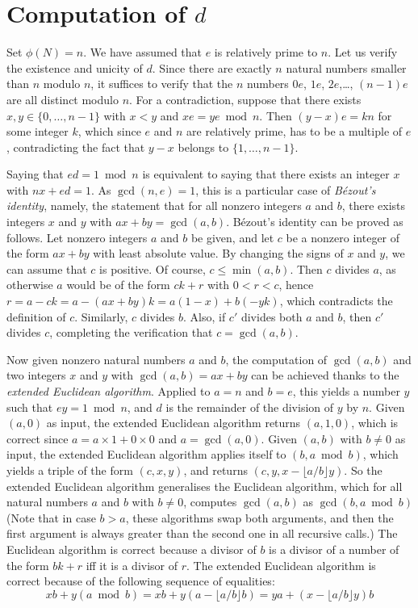 \documentclass{amsart}
\begin{document}
\section{Computation of $d$}

Set $\phi(N)=n$. We have assumed that $e$ is relatively prime to $n$. Let us verify the existence and unicity of $d$. Since there are exactly $n$ natural numbers smaller than $n$ modulo $n$, it suffices to verify that the $n$ numbers $0e$, $1e$, $2e$,\dots, $(n-1)e$ are all distinct modulo $n$. For a contradiction, suppose that there exists $x,y\in\{0,\dots,n-1\}$ with $x<y$ and $xe=ye\bmod n$. Then $(y-x)e=kn$ for some integer $k$, which since $e$ and $n$ are relatively prime, has to be a multiple of $e$, contradicting the fact that $y-x$ belongs to $\{1,\dots,n-1\}$.

Saying that $ed=1\bmod n$ is equivalent to saying that there exists an integer $x$ with $nx+ed=1$. As $\gcd(n,e)=1$, this is a particular case of \emph{B\'ezout's identity}, namely, the statement that for all nonzero integers $a$ and $b$, there exists integers $x$ and $y$ with $ax+by=\gcd(a,b)$. B\'ezout's identity can be proved as follows. Let nonzero integers $a$ and $b$ be given, and let $c$ be a nonzero integer of the form $ax+by$ with least absolute value. By changing the signs of $x$ and $y$, we can assume that $c$ is positive. Of course, $c\leq\min(a,b)$. Then $c$ divides $a$, as otherwise $a$ would be of the form $ck+r$ with $0<r<c$, hence $r=a-ck=a-(ax+by)k=a(1-x)+b(-yk)$, which contradicts the definition of $c$. Similarly, $c$ divides $b$. Also, if $c'$ divides both $a$ and $b$, then $c'$ divides $c$, completing the verification that $c=\gcd(a,b)$.

Now given nonzero natural numbers $a$ and $b$, the computation of $\gcd(a,b)$ and two integers $x$ and $y$ with $\gcd(a,b)=ax+by$ can be achieved thanks to the \emph{extended Euclidean algorithm}. Applied to $a=n$ and $b=e$, this yields a number $y$ such that $ey=1\bmod n$, and $d$ is the remainder of the division of $y$ by $n$. Given $(a,0)$ as input, the extended Euclidean algorithm returns $(a,1,0)$, which is correct since $a=a\times1+0\times0$ and $a=\gcd(a,0)$. Given $(a,b)$ with $b\neq 0$ as input, the extended Euclidean algorithm applies itself to $(b, a\bmod b)$, which yields a triple of the form $(c,x,y)$, and returns $(c, y, x-\lfloor a/b\rfloor y)$. So the extended Euclidean algorithm generalises the Euclidean algorithm, which for all natural numbers $a$ and $b$ with $b\neq 0$, computes $\gcd(a,b)$ as $\gcd(b,a\bmod b)$ (Note that in case $b>a$, these algorithms swap both arguments, and then the first argument is always greater than the second one in all recursive calls.) The Euclidean algorithm is correct because a divisor of $b$ is a divisor of a number of the form $bk+r$ iff it is a divisor of $r$. The extended Euclidean algorithm is correct because of the following sequence of equalities:
\[
xb+y(a\bmod b)=xb+y(a-\lfloor a/b\rfloor b)=ya+(x-\lfloor a/b\rfloor y)b
\]
\end{document}
